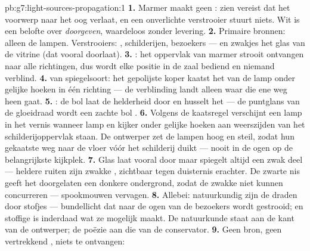 \begin{solution}{pb:g7:light-sources-propagation:1}
\textbf{1.} Marmer maakt geen : zien vereist  dat het
voorwerp naar het oog verlaat, en een onverlichte verstrooier stuurt
niets. Wit is een belofte over \emph{doorgeven}, waardeloos zonder
levering.
\textbf{2.} Primaire bronnen: alleen de lampen. Verstrooiers: ,
schilderijen, bezoekers --- en zwakjes het glas van de vitrine (dat
vooral doorlaat).
\textbf{3.} : het oppervlak van marmer strooit ontvangen
 naar alle richtingen, dus wordt elke positie in de zaal
bediend en niemand verblind.
\textbf{4.}  van spiegelsoort: het gepolijste koper
kaatst het  van de lamp onder gelijke hoeken in één richting
--- de verblinding landt alleen waar die ene weg heen gaat.
\textbf{5.} : de bol laat de helderheid door en husselt
het  --- de puntglans van de gloeidraad wordt een zachte bol
.
\textbf{6.} Volgens de kaatsregel verschijnt een lamp in het vernis
wanneer lamp en kijker onder gelijke hoeken aan weerszijden van het
schilderijoppervlak staan. De ontwerper zet de lampen hoog en steil,
zodat hun gekaatste weg naar de vloer vóór het schilderij duikt ---
nooit in de ogen op de belangrijkste kijkplek.
\textbf{7.} Glas laat vooral door maar spiegelt altijd een zwak deel
--- heldere ruiten zijn zwakke , zichtbaar tegen duisternis
erachter. De zwarte nis geeft het doorgelaten  een donkere
ondergrond, zodat de zwakke  niet kunnen concurreren ---
spookmouwen vervagen.
\textbf{8.} Allebei: natuurkundig zijn de draden  door
stofjes --- bundellicht dat naar de ogen van de bezoekers wordt
gestrooid; en stoffige  is inderdaad wat ze mogelijk maakt. De
natuurkunde staat aan de kant van de ontwerper; de poëzie aan die van
de conservator.
\textbf{9.} Geen bron, geen vertrekkend , niets te ontvangen:

\end{solution}
